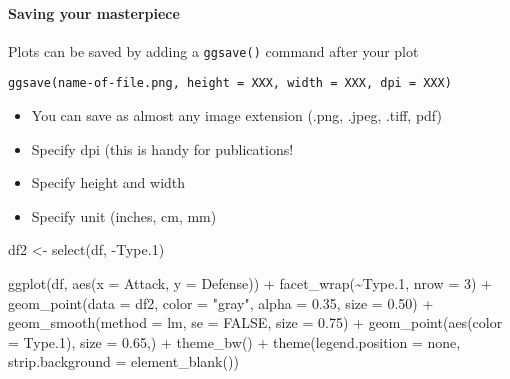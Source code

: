 \documentclass[
]{article}
\newenvironment{Shaded}{\begin{snugshade}}{\end{snugshade}}
\newcommand{\AttributeTok}[1]{\textcolor[rgb]{0.77,0.63,0.00}{#1}}
\newcommand{\ConstantTok}[1]{\textcolor[rgb]{0.00,0.00,0.00}{#1}}
\newcommand{\DecValTok}[1]{\textcolor[rgb]{0.00,0.00,0.81}{#1}}
\newcommand{\FloatTok}[1]{\textcolor[rgb]{0.00,0.00,0.81}{#1}}
\newcommand{\FunctionTok}[1]{\textcolor[rgb]{0.00,0.00,0.00}{#1}}
\newcommand{\NormalTok}[1]{#1}
\newcommand{\OtherTok}[1]{\textcolor[rgb]{0.56,0.35,0.01}{#1}}
\newcommand{\SpecialCharTok}[1]{\textcolor[rgb]{0.00,0.00,0.00}{#1}}
\newcommand{\StringTok}[1]{\textcolor[rgb]{0.31,0.60,0.02}{#1}}
\begin{document}
\hypertarget{saving-your-masterpiece}{%
\paragraph{Saving your masterpiece}\label{saving-your-masterpiece}}

Plots can be saved by adding a \texttt{ggsave()} command after your plot

\texttt{ggsave(\textquotesingle{}name-of-file.png\textquotesingle{},\ height\ =\ XXX,\ width\ =\ XXX,\ dpi\ =\ XXX)}

\begin{itemize}
\item
  You can save as almost any image extension (.png, .jpeg, .tiff, pdf)
\item
  Specify dpi (this is handy for publications!
\item
  Specify height and width
\item
  Specify unit (inches, cm, mm)
\end{itemize}

\begin{Shaded}
\begin{Highlighting}[]
\NormalTok{df2 }\OtherTok{\textless{}{-}} \FunctionTok{select}\NormalTok{(df, }\SpecialCharTok{{-}}\NormalTok{Type}\FloatTok{.1}\NormalTok{)               }

\FunctionTok{ggplot}\NormalTok{(df, }\FunctionTok{aes}\NormalTok{(}\AttributeTok{x =}\NormalTok{ Attack, }\AttributeTok{y =}\NormalTok{ Defense)) }\SpecialCharTok{+}
  \FunctionTok{facet\_wrap}\NormalTok{(}\SpecialCharTok{\textasciitilde{}}\NormalTok{Type}\FloatTok{.1}\NormalTok{,                   }
             \AttributeTok{nrow =} \DecValTok{3}\NormalTok{) }\SpecialCharTok{+}
    \FunctionTok{geom\_point}\NormalTok{(}\AttributeTok{data =}\NormalTok{ df2,             }
             \AttributeTok{color =} \StringTok{"gray"}\NormalTok{,}
             \AttributeTok{alpha =} \FloatTok{0.35}\NormalTok{,}
             \AttributeTok{size =} \FloatTok{0.50}\NormalTok{) }\SpecialCharTok{+}
  \FunctionTok{geom\_smooth}\NormalTok{(}\AttributeTok{method =} \StringTok{\textquotesingle{}lm\textquotesingle{}}\NormalTok{,             }
              \AttributeTok{se =} \ConstantTok{FALSE}\NormalTok{,               }
              \AttributeTok{size =} \FloatTok{0.75}\NormalTok{) }\SpecialCharTok{+}
  \FunctionTok{geom\_point}\NormalTok{(}\FunctionTok{aes}\NormalTok{(}\AttributeTok{color =}\NormalTok{ Type}\FloatTok{.1}\NormalTok{),  }
             \AttributeTok{size =} \FloatTok{0.65}\NormalTok{,) }\SpecialCharTok{+}
  \FunctionTok{theme\_bw}\NormalTok{() }\SpecialCharTok{+} 
  \FunctionTok{theme}\NormalTok{(}\AttributeTok{legend.position =} \StringTok{\textquotesingle{}none\textquotesingle{}}\NormalTok{,           }
        \AttributeTok{strip.background =} \FunctionTok{element\_blank}\NormalTok{())}
\end{Highlighting}
\end{Shaded}
\end{document}
